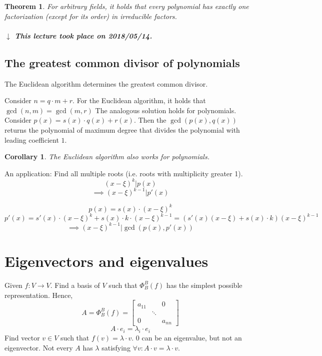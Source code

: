 \documentclass{article}
\newtheorem{theorem}{Theorem}  \numberwithin{theorem}{section}
\newtheorem{corollary}{Corollary}  \numberwithin{corollary}{section}
\newcommand{\dateref}[1]{%
  \begin{mdframed}[backgroundcolor=gray!10,innerbottommargin=0pt,innertopmargin=0pt]
    \paragraph{\textit{$\downarrow$ This lecture took place on #1.}}%
  \end{mdframed}%
}
\begin{document}
\begin{theorem} %
  For arbitrary fields, it holds that
  every polynomial has exactly one factorization (except for its order) in irreducible factors.
\end{theorem}

\dateref{2018/05/14}

\subsection{The greatest common divisor of polynomials}

The Euclidean algorithm determines the greatest common divisor.

Consider $n = q \cdot m + r$. For the Euclidean algorithm, it holds that $\operatorname{gcd}(n, m) = \operatorname{gcd}(m, r)$
The analogous solution holds for polynomials. Consider $p(x) = s(x) \cdot q(x) + r(x)$.
Then the $\operatorname{gcd}(p(x), q(x))$ returns the polynomial of maximum degree that divides the polynomial with leading coefficient $1$.

\begin{corollary}
  The Euclidean algorithm also works for polynomials.
\end{corollary}

An application: Find all multiple roots (i.e. roots with multiplicity greater 1).
\[ (x - \xi)^k | p(x) \]
\[ \implies (x - \xi)^{k-1} | p'(x) \]

\[ p(x) = s(x) \cdot (x - \xi)^k \]
\[ p'(x) = s'(x) \cdot (x - \xi)^k + s(x) \cdot k \cdot (x - \xi)^{k-1} = (s'(x) (x - \xi) + s(x) \cdot k) (x - \xi)^{k-1} \]
\[ \implies (x - \xi)^{k-1} | \operatorname{gcd}(p(x), p'(x)) \]

\section{Eigenvectors and eigenvalues} %

Given $f: V \to V$. Find a basis of $V$ such that $\Phi_B^B(f)$ has the simplest possible representation.
Hence,
\[ A = \Phi_B^B(f) = \begin{bmatrix} a_{11} &  & 0 \\ & \ddots & \\ 0 &  & a_{nn} \end{bmatrix} \]
\[ A \cdot e_i = \lambda_i \cdot e_i \]
Find vector $v \in V$ such that $f(v) = \lambda \cdot v$.
$0$ can be an eigenvalue, but not an eigenvector. Not every $A$ has $\lambda$ satisfying $\forall v: A \cdot v = \lambda \cdot v$.
\end{document}
